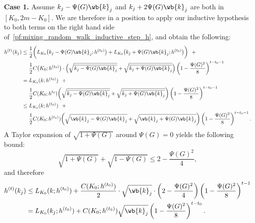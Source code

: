 \documentclass[twoside,11pt]{article}
\newcommand{\1}{\mathbf{1}}
\begin{document}
\textbf{Case 1.}
Assume $k_j - \Psi(G) \wb{k}_j$ and $k_j + 2 \Psi(G) \wb{k}_j$ are both in $[K_0,2m  - K_0]$. We are therefore in a position to apply our inductive hypothesis to both terms on the right hand side of~\eqref{pf:mixing_random_walk_inductive_step_h}, and obtain the following:
\begin{align*}
h^{(t)}(k_j) & \leq \frac{1}{2}\biggl(L_{K_0}\bigl(k_j - \Psi(G) \wb{k}_j; h^{(t_0)}\bigr) + L_{K_0}\bigl(k_j + \Psi(G) \wb{k}_j; h^{(t_0)}\bigr) \biggr) ~~+ \\
& \quad~ \frac{1}{2}C\bigl(K_0; h^{(t_0)}\bigr) \cdot \Bigl(\sqrt{\overline{k_j - \Psi(G) \wb{k}_j}} + \sqrt{\overline{k_j + \Psi(G) \wb{k}_j}}\Bigr)\left(1 - \frac{\Psi(G)^2}{8}\right)^{t-t_0 - 1} \\
& = L_{K_0}(k;h^{(t_0)}) ~~+ \\
& \quad~\frac{1}{2}C(K_0;h^{t_0})\biggl(\sqrt{\overline{k_j - \Psi(G) \wb{k}_j}} + \sqrt{\overline{k_j + \Psi(G) \wb{k}_j}}\biggr)\left(1 - \frac{\Psi(G)^2}{8}\right)^{t-t_0 - 1} \\
& \leq L_{K_0}(k;h^{(t_0)}) ~~+ \\
& \quad~\frac{1}{2}C(K_0;h^{(t_0)})\biggl(\sqrt{\wb{k}_j - \Psi(G) \wb{k}_j} + \sqrt{\wb{k}_j + \Psi(G) \wb{k}_j}\biggr)\left(1 - \frac{\Psi(G)^2}{8}\right)^{t-t_0 - 1}.
\end{align*}
A Taylor expansion of $\sqrt{1 + \Psi(G)}$ around $\Psi(G) = 0$ yields the following bound:
\begin{equation*}
\sqrt{1 + \Psi(G)} + \sqrt{1 - \Psi(G)} \leq 2 - \frac{\Psi(G)^2}{4},
\end{equation*}
and therefore
\begin{align*}
h^{(t)}(k_j) & \leq L_{K_0}(k;h^{(t_0)}) + \frac{C(K_0;h^{(t_0)})}{2}\cdot \sqrt{\wb{k}_j}\cdot\left(2 - \frac{\Psi(G)^2}{4}\right)\left(1 - \frac{\Psi(G)^2}{8}\right)^{t-1} \\
&= L_{K_0}(k_j;h^{(t_0)}) + C(K_0;h^{(t_0)})\sqrt{\wb{k}_j}\left(1 - \frac{\Psi(G)^2}{8}\right)^{t - t_0}.
\end{align*}
\end{document}
